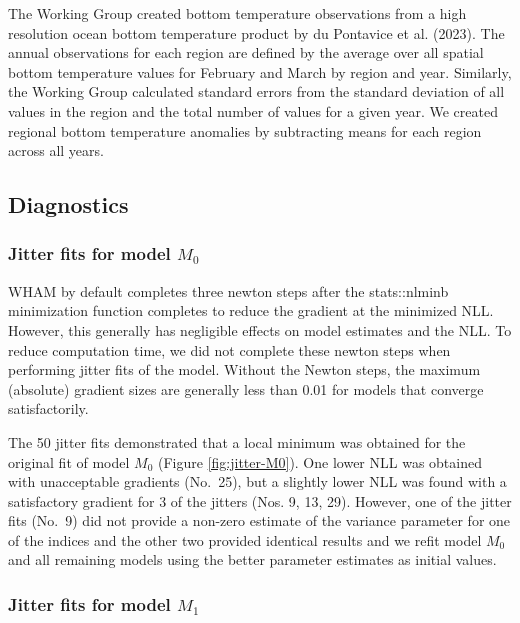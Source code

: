 \documentclass[
]{article}
\begin{document}
The Working Group created bottom temperature observations from a high resolution ocean bottom temperature product by du Pontavice et al. (2023). The annual observations for each region are defined by the average over all spatial bottom temperature values for February and March by region and year. Similarly, the Working Group calculated standard errors from the standard deviation of all values in the region and the total number of values for a given year. We created regional bottom temperature anomalies by subtracting means for each region across all years.

\hypertarget{diagnostics}{%
\subsection*{Diagnostics}\label{diagnostics}}

\hypertarget{jitter-fits-for-model-m_0}{%
\subsubsection*{\texorpdfstring{Jitter fits for model \(M_0\)}{Jitter fits for model M\_0}}\label{jitter-fits-for-model-m_0}}

WHAM by default completes three newton steps after the stats::nlminb minimization function completes to reduce the gradient at the minimized NLL. However, this generally has negligible effects on model estimates and the NLL. To reduce computation time, we did not complete these newton steps when performing jitter fits of the model. Without the Newton steps, the maximum (absolute) gradient sizes are generally less than 0.01 for models that converge satisfactorily.

The 50 jitter fits demonstrated that a local minimum was obtained for the original fit of model \(M_0\) (Figure \ref{fig:jitter-M0}). One lower NLL was obtained with unacceptable gradients (No.~25), but a slightly lower NLL was found with a satisfactory gradient for 3 of the jitters (Nos. 9, 13, 29). However, one of the jitter fits (No.~9) did not provide a non-zero estimate of the variance parameter for one of the indices and the other two provided identical results and we refit model \(M_0\) and all remaining models using the better parameter estimates as initial values.

\hypertarget{jitter-fits-for-model-m_1}{%
\subsubsection*{\texorpdfstring{Jitter fits for model \(M_1\)}{Jitter fits for model M\_1}}\label{jitter-fits-for-model-m_1}}
\end{document}
